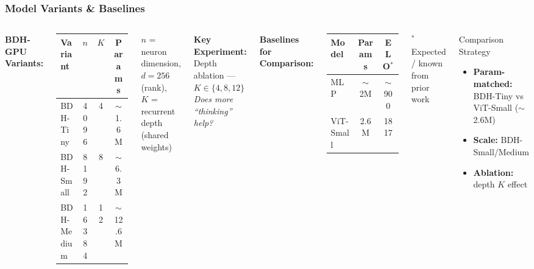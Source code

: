 \documentclass{beamer}
\begin{document}
\begin{frame}
\frametitle{Model Variants \& Baselines}

\begin{columns}
\textbf{BDH-GPU Variants:}
\begin{table}
\centering
\footnotesize
\begin{tabular}{lccc}
\toprule
\textbf{Variant} & $n$ & $K$ & \textbf{Params} \\
\midrule
BDH-Tiny & 4096 & 4 & $\sim$1.6M \\
BDH-Small & 8192 & 8 & $\sim$6.3M \\
BDH-Medium & 16384 & 12 & $\sim$12.6M \\
\bottomrule
\end{tabular}
\end{table}

\vspace{0.5em}
$n$ = neuron dimension, $d = 256$ (rank),\\
$K$ = recurrent depth (shared weights)

\vspace{0.5em}
\textbf{Key Experiment:}\\
Depth ablation --- $K \in \{4, 8, 12\}$\\
\emph{Does more ``thinking'' help?}

\textbf{Baselines for Comparison:}
\begin{table}
\centering
\footnotesize
\begin{tabular}{lcc}
\toprule
\textbf{Model} & \textbf{Params} & \textbf{ELO$^*$} \\
\midrule
MLP & $\sim$2M & $\sim$900 \\
ViT-Small & 2.6M & 1817 \\
\bottomrule
\end{tabular}

\vspace{0.3em}
{\tiny $^*$Expected / known from prior work}
\end{table}

\vspace{0.5em}
\begin{block}{Comparison Strategy}
\footnotesize
\begin{itemize}
    \item \textbf{Param-matched:} BDH-Tiny vs ViT-Small ($\sim$2.6M)
    \item \textbf{Scale:} BDH-Small/Medium
    \item \textbf{Ablation:} depth $K$ effect
\end{itemize}
\end{block}
\end{columns}

\end{frame}
\end{document}
